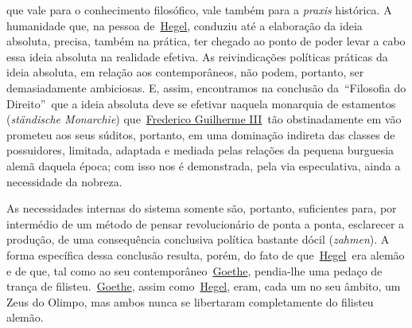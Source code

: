 que vale para o conhecimento filosófico, vale também para a
\emph{praxis} histórica. A humanidade que, na pessoa
de~\href{https://www.marxists.org/portugues/dicionario/verbetes/h/hegel.htm}{Hegel},
conduziu até a elaboração da ideia absoluta, precisa, também na prática,
ter chegado ao ponto de poder levar a cabo essa ideia absoluta na
realidade efetiva. As reivindicações políticas práticas da ideia
absoluta, em relação aos contemporâneos, não podem, portanto, ser
demasiadamente ambiciosas. E, assim, encontramos na conclusão
da~``Filosofia do Direito''\emph{~}que a ideia absoluta deve se efetivar
naquela monarquia de estamentos (\emph{ständische Monarchie})
que~\href{https://www.marxists.org/portugues/dicionario/verbetes/f/frederico_guilerme_3.htm}{Frederico
Guilherme III}~tão obstinadamente em vão prometeu aos seus súditos,
portanto, em uma dominação indireta das classes de possuidores,
limitada, adaptada e mediada pelas relações da pequena burguesia alemã
daquela época; com isso nos é demonstrada, pela via especulativa, ainda
a necessidade da nobreza.

As necessidades internas do sistema somente são, portanto, suficientes
para, por intermédio de um método de pensar revolucionário de ponta a
ponta, esclarecer a produção, de uma consequência conclusiva política
bastante dócil (\emph{zahmen}). A forma específica dessa conclusão
resulta, porém, do fato de
que~\href{https://www.marxists.org/portugues/dicionario/verbetes/h/hegel.htm}{Hegel}~era
alemão e de que, tal como ao seu
contemporâneo~\href{https://www.marxists.org/portugues/dicionario/verbetes/g/goethe.htm}{Goethe},
pendia-lhe uma pedaço de trança de
filisteu.~\href{https://www.marxists.org/portugues/dicionario/verbetes/g/goethe.htm}{Goethe},
assim
como~\href{https://www.marxists.org/portugues/dicionario/verbetes/h/hegel.htm}{Hegel},
eram, cada um no seu âmbito, um Zeus do Olimpo, mas ambos nunca se
libertaram completamente do filisteu alemão.

